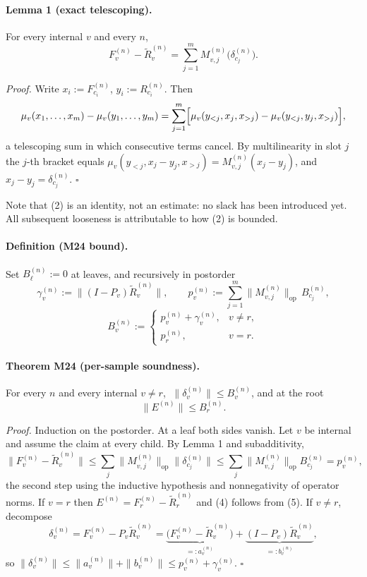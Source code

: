 \paragraph{Lemma 1 (exact telescoping).}
For every internal $v$ and every $n$,
\[
  F_v^{(n)}-\widetilde R_v^{(n)}
  =\sum_{j=1}^{m}M_{v,j}^{(n)}\bigl(\delta_{c_j}^{(n)}\bigr).
\tag{2}
\]

\emph{Proof.} Write $x_i:=F_{c_i}^{(n)}$, $y_i:=R_{c_i}^{(n)}$. Then
\[
 \mu_v(x_1,\dots,x_m)-\mu_v(y_1,\dots,y_m)
 =\sum_{j=1}^m\Bigl[\mu_v(y_{<j},x_j,x_{>j})-\mu_v(y_{<j},y_j,x_{>j})\Bigr],
\]
a telescoping sum in which consecutive terms cancel. By multilinearity in
slot $j$ the $j$-th bracket equals $\mu_v(y_{<j},x_j-y_j,x_{>j})
=M_{v,j}^{(n)}(x_j-y_j)$, and $x_j-y_j=\delta_{c_j}^{(n)}$. $\square$

Note that (2) is an identity, not an estimate: no slack has been introduced
yet. All subsequent looseness is attributable to how (2) is bounded.

\paragraph{Definition (M24 bound).}
Set $B_\ell^{(n)}:=0$ at leaves, and recursively in postorder
\[
  \gamma_v^{(n)}:=\bigl\|(I-P_v)\widetilde R_v^{(n)}\bigr\|,
  \qquad
  p_v^{(n)}:=\sum_{j=1}^m\bigl\|M_{v,j}^{(n)}\bigr\|_{\mathrm{op}}\,B_{c_j}^{(n)},
\]
\[
  B_v^{(n)}:=
  \begin{cases}
    p_v^{(n)}+\gamma_v^{(n)}, & v\ne r,\\
    p_r^{(n)}, & v=r.
  \end{cases}
\tag{3}
\]

\paragraph{Theorem M24 (per-sample soundness).}
For every $n$ and every internal $v\ne r$, $\;\|\delta_v^{(n)}\|\le B_v^{(n)}$,
and at the root
\[
  \boxed{\;\bigl\|E^{(n)}\bigr\|\le B_r^{(n)}.\;}
\tag{4}
\]

\emph{Proof.} Induction on the postorder. At a leaf both sides vanish. Let
$v$ be internal and assume the claim at every child. By Lemma 1 and
subadditivity,
\[
 \bigl\|F_v^{(n)}-\widetilde R_v^{(n)}\bigr\|
 \le\sum_j\bigl\|M_{v,j}^{(n)}\bigr\|_{\mathrm{op}}\bigl\|\delta_{c_j}^{(n)}\bigr\|
 \le\sum_j\bigl\|M_{v,j}^{(n)}\bigr\|_{\mathrm{op}}B_{c_j}^{(n)}=p_v^{(n)},
\tag{5}
\]
the second step using the inductive hypothesis and nonnegativity of operator
norms. If $v=r$ then $E^{(n)}=F_r^{(n)}-\widetilde R_r^{(n)}$ and (4) follows
from (5). If $v\ne r$, decompose
\[
 \delta_v^{(n)}
 =F_v^{(n)}-P_v\widetilde R_v^{(n)}
 =\underbrace{\bigl(F_v^{(n)}-\widetilde R_v^{(n)}\bigr)}_{=:a_v^{(n)}}
 +\underbrace{(I-P_v)\widetilde R_v^{(n)}}_{=:b_v^{(n)}},
\tag{6}
\]
so $\|\delta_v^{(n)}\|\le\|a_v^{(n)}\|+\|b_v^{(n)}\|\le p_v^{(n)}+\gamma_v^{(n)}$.
$\square$

